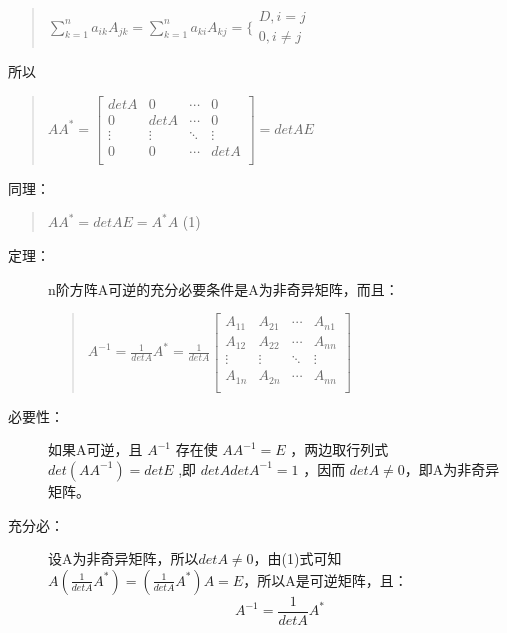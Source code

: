 \documentclass[a4paper,10pt]{article}
\begin{document}
\begin{CJK}{UTF8}{song}
\begin{quote}
\begin{math}
\sum_{k=1}^{n}a_{ik}A_{jk}=\sum_{k=1}^{n}a_{ki}A_{kj}=
\biggl\{ \begin{array}{c}
D,i=j \\
0,i\neq{}j 
\end{array} 
\end{math}
\end{quote}
所以
\begin{quote}
$AA^{*}=\left[
\begin{array}{cccc}
detA& 0 & \cdots{} & 0 \\
0 & detA & \cdots{} & 0 \\
\vdots{} & \vdots{} & \ddots{} & \vdots{} \\
0 & 0 & \cdots{} & detA \\
\end{array}\right]
=detAE
$
\end{quote}
同理：
\begin{quote}
$AA^{*}=detAE=A^{*}A$   (1)
\end{quote}
\begin{description}
\item[定理：]n阶方阵A可逆的充分必要条件是A为非奇异矩阵，而且：
\begin{quote}
$
A^{-1}=\frac{1}{detA}A^{*}=\frac{1}{detA} 
\left[\begin{array}{cccc}
A_{11}&A_{21}&\cdots{}&A_{n1} \\
A_{12}&A_{22}&\cdots{}&A_{nn} \\
\vdots&\vdots&\ddots{}&\vdots \\
A_{1n}&A_{2n}&\cdots{}&A_{nn} \\          
\end{array}\right] $
\end{quote}
\item[必要性：]
如果A可逆，且 $A^{-1}$ 存在使 $AA^{-1}=E$ ，两边取行列式 $det(AA^{-1})=detE$ ,即 $detAdetA^{-1}=1$ ，因而 $detA\neq{}0$，即A为非奇异矩阵。
\item[充分必：]
设A为非奇异矩阵，所以$detA\neq{}0$，由(1)式可知$A(\frac{1}{detA}A^{*})=(\frac{1}{detA}A^{*})A=E$，所以A是可逆矩阵，且：
\begin{displaymath}
A^{-1}=\frac{1}{detA}A^{*}
\end{displaymath}

\end{description}





































\end{CJK}
\end{document}
